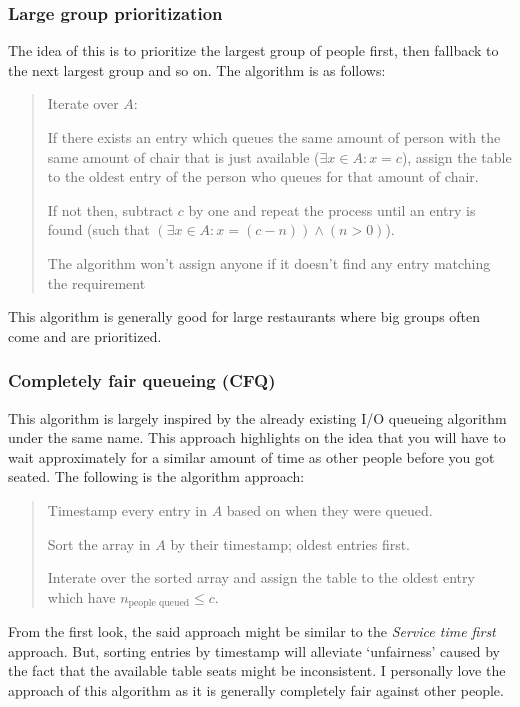 \documentclass[
  11pt, %
]{assignment}
\begin{document}
\subsubsection*{Large group prioritization}

The idea of this is to prioritize the largest group of people first, then fallback to the next largest group and so on. The algorithm is as follows:

\begin{quote}
  Iterate over \(A\):

  If there exists an entry which queues the same amount of person with the same amount of chair that is just available (\(\exists x \in A: x = c\)), assign the table to the oldest entry of the person who queues for that amount of chair.

  If not then, subtract \(c\) by one and repeat the process until an entry is found (such that \((\exists x \in A: x = (c - n)) \land (n > 0)\)).

  The algorithm won't assign anyone if it doesn't find any entry matching the requirement
\end{quote}

This algorithm is generally good for large restaurants where big groups often come and are prioritized.

\subsubsection*{Completely fair queueing (CFQ)}

This algorithm is largely inspired by the already existing I/O queueing algorithm under the same name. This approach highlights on the idea that you will have to wait approximately for a similar amount of time as other people before you got seated. The following is the algorithm approach:

\begin{quote}
  Timestamp every entry in \(A\) based on when they were queued.

  Sort the array in \(A\) by their timestamp; oldest entries first.

  Interate over the sorted array and assign the table to the oldest entry which have \(n_\text{people queued} \leq c\).
\end{quote}

From the first look, the said approach might be similar to the \textit{Service time first} approach. But, sorting entries by timestamp will alleviate `unfairness' caused by the fact that the available table seats might be inconsistent. I personally love the approach of this algorithm as it is generally completely fair against other people.
\end{document}
